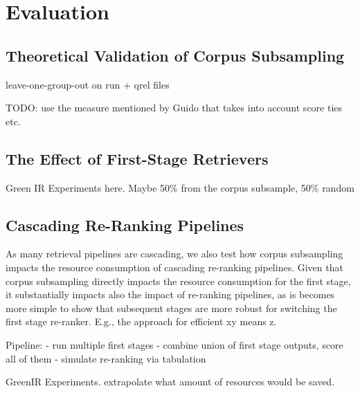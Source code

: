 \section{Evaluation}

\subsection{Theoretical Validation of Corpus Subsampling}

leave-one-group-out on run + qrel files



{\color{red}} TODO: use the measure mentioned by Guido that takes into account score ties etc.

\subsection{The Effect of First-Stage Retrievers}

Green IR Experiments here.
Maybe 50\% from the corpus subsample, 50\% random

\subsection{Cascading Re-Ranking Pipelines}

As many retrieval pipelines are cascading, we also test how corpus subsampling impacts the resource consumption of cascading re-ranking pipelines. Given that corpus subsampling directly impacts the resource consumption for the first stage, it substantially impacts also the impact of re-ranking pipelines, as is becomes more simple to show that subsequent stages are more robust for switching the first stage re-ranker. E.g., the approach for efficient xy means z.

Pipeline:
- run multiple first stages
- combine union of first stage outputs, score all of them
- simulate re-ranking via tabulation

{\color{red} GreenIR Experiments. extrapolate what amount of resources would be saved.}
